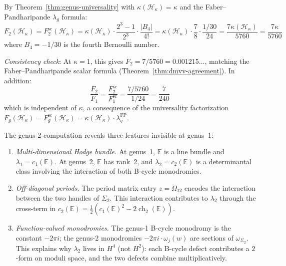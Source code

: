 \begin{computation}\label{comp:heisenberg-F2-universality}
By Theorem~\ref{thm:genus-universality} with $\kappa(\mathcal{H}_\kappa) = \kappa$ and the Faber--Pandharipande $\lambda_g$ formula:
\begin{equation}
F_2(\mathcal{H}_\kappa)=F_2^{\mathrm{sc}}(\mathcal{H}_\kappa)
= \kappa(\mathcal{H}_\kappa) \cdot \frac{2^3-1}{2^3} \cdot \frac{|B_4|}{4!}
= \kappa(\mathcal{H}_\kappa) \cdot \frac{7}{8} \cdot \frac{1/30}{24}
= \frac{7\kappa(\mathcal{H}_\kappa)}{5760}
= \frac{7\kappa}{5760}
\end{equation}
where $B_4 = -1/30$ is the fourth Bernoulli number.

\emph{Consistency check}: At $\kappa = 1$, this gives
$F_2 = 7/5760 = 0.001215\ldots$, matching the
Faber--Pandharipande scalar formula
(Theorem~\ref{thm:dmvv-agreement}). In addition:
\begin{equation}
\frac{F_2}{F_1}
=\frac{F_2^{\mathrm{sc}}}{F_1^{\mathrm{sc}}}
= \frac{7/5760}{1/24}
= \frac{7}{240}
\end{equation}
which is independent of $\kappa$, a consequence of the universality factorization
$F_g(\mathcal{H}_\kappa)=F_g^{\mathrm{sc}}(\mathcal{H}_\kappa)
=\kappa(\mathcal{H}_\kappa) \cdot \lambda_g^{\mathrm{FP}}$.
\end{computation}

\begin{remark}\label{rem:genus2-structural}
The genus-2 computation reveals three features invisible at genus~1:
\begin{enumerate}
\item \emph{Multi-dimensional Hodge bundle.} At genus~1, $\mathbb{E}$ is a line bundle and $\lambda_1 = c_1(\mathbb{E})$. At genus~2, $\mathbb{E}$ has rank~2, and $\lambda_2 = c_2(\mathbb{E})$ is a determinantal class involving the interaction of both B-cycle monodromies.
\item \emph{Off-diagonal periods.} The period matrix entry $z = \Omega_{12}$ encodes the interaction between the two handles of $\Sigma_2$. This interaction contributes to $\lambda_2$ through the cross-term in $c_2(\mathbb{E}) = \frac{1}{2}(c_1(\mathbb{E})^2 - 2\operatorname{ch}_2(\mathbb{E}))$.
\item \emph{Function-valued monodromies.} The genus-1 B-cycle monodromy is the constant $-2\pi i$; the genus-2 monodromies $-2\pi i \cdot \omega_j(w)$ are sections of $\omega_{\Sigma_2}$. This explains why $\lambda_2$ lives in $H^4$ (not $H^2$): each B-cycle defect contributes a $2$-form on moduli space, and the two defects combine multiplicatively.
\end{enumerate}
\end{remark}


